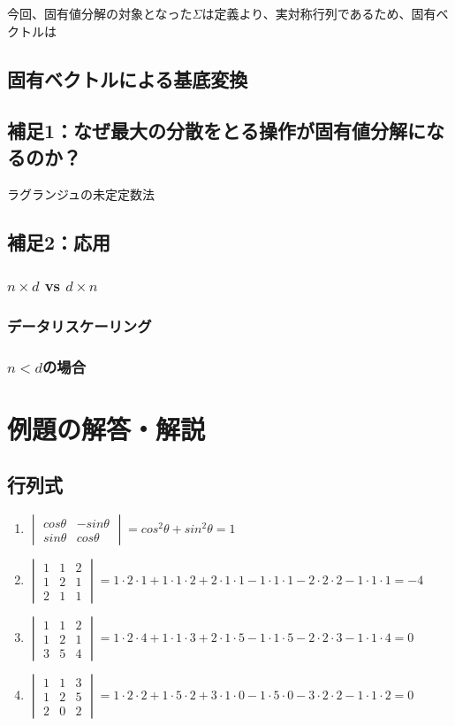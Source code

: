 \documentclass[10pt]{ujarticle}
\begin{document}
今回、固有値分解の対象となった$\Sigma$は定義より、実対称行列であるため、固有ベクトルは
\subsection{固有ベクトルによる基底変換}
\subsection{補足1：なぜ最大の分散をとる操作が固有値分解になるのか？}
ラグランジュの未定定数法
\subsection{補足2：応用}
\subsubsection{$n\times d$ vs $d\times n$}
\subsubsection{データリスケーリング}
\subsubsection{$n<d$の場合}


\section{例題の解答・解説}
\hypertarget{q1}{\subsection{行列式}}
\begin{enumerate}
  \item $\begin{vmatrix} cos\theta & -sin\theta\\ sin\theta & cos\theta \end{vmatrix}=cos^2\theta +sin^2\theta=1$
  \item $\begin{vmatrix} 1 & 1 & 2 \\ 1 & 2 & 1 \\ 2 & 1 & 1 \end{vmatrix}=1\cdot 2\cdot 1+1\cdot 1\cdot 2+2\cdot 1\cdot 1-1\cdot 1\cdot 1-2\cdot 2\cdot 2-1\cdot 1\cdot 1=-4$
  \item $\begin{vmatrix} 1 & 1 & 2 \\ 1 & 2 & 1 \\ 3 & 5 & 4 \end{vmatrix}=1\cdot 2\cdot 4+1\cdot 1\cdot 3+2\cdot 1\cdot 5-1\cdot 1\cdot 5-2\cdot 2\cdot 3-1\cdot 1\cdot 4=0$
  \item $\begin{vmatrix} 1 & 1 & 3 \\ 1 & 2 & 5 \\ 2 & 0 & 2 \end{vmatrix}=1\cdot 2\cdot 2+1\cdot 5\cdot 2+3\cdot 1\cdot 0-1\cdot 5\cdot 0-3\cdot 2\cdot 2-1\cdot 1\cdot 2=0$
\end{enumerate}
\end{document}
